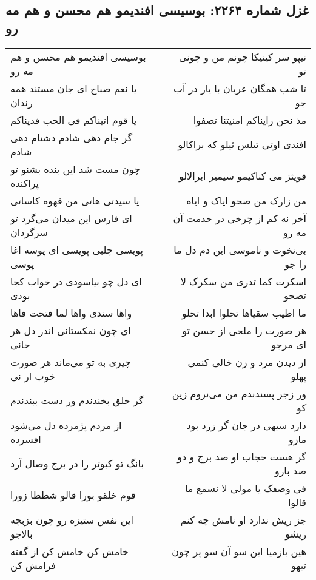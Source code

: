 \begin{center}
\section*{غزل شماره ۲۲۶۴: بوسیسی افندیمو هم محسن و هم مه رو}
\label{sec:2264}
\begin{longtable}{l p{0.5cm} r}
بوسیسی افندیمو هم محسن و هم مه رو
&&
نیپو سر کینیکا چونم من و چونی تو
\\
یا نعم صباح ای جان مستند همه رندان
&&
تا شب همگان عریان با یار در آب جو
\\
یا قوم اتیناکم فی الحب فدیناکم
&&
مذ نحن رایناکم امنیتنا تصفوا
\\
گر جام دهی شادم دشنام دهی شادم
&&
افندی اوتی تیلس ثیلو که براکالو
\\
چون مست شد این بنده بشنو تو پراکنده
&&
قویثز می کناکیمو سیمیر ابرالالو
\\
یا سیدتی هاتی من قهوه کاساتی
&&
من زارک من صحو ایاک و ایاه
\\
ای فارس این میدان می‌گرد تو سرگردان
&&
آخر نه کم از چرخی در خدمت آن مه رو
\\
پویسی چلبی پویسی ای پوسه اغا پوسی
&&
بی‌نخوت و ناموسی این دم دل ما را جو
\\
ای دل چو بیاسودی در خواب کجا بودی
&&
اسکرت کما تدری من سکرک لا تصحو
\\
واها سندی واها لما فتحت فاها
&&
ما اطیب سقیاها تحلوا ابدا تحلو
\\
ای چون نمکستانی اندر دل هر جانی
&&
هر صورت را ملحی از حسن تو ای مرجو
\\
چیزی به تو می‌ماند هر صورت خوب ار نی
&&
از دیدن مرد و زن خالی کنمی پهلو
\\
گر خلق بخندندم ور دست ببندندم
&&
ور زجر پسندندم من می‌نروم زین کو
\\
از مردم پژمرده دل می‌شود افسرده
&&
دارد سیهی در جان گر زرد بود مازو
\\
بانگ تو کبوتر را در برج وصال آرد
&&
گر هست حجاب او صد برج و دو صد بارو
\\
قوم خلقو بورا قالو شططا زورا
&&
فی وصفک یا مولی لا نسمع ما قالوا
\\
این نفس ستیزه رو چون بزبچه بالاجو
&&
جز ریش ندارد او نامش چه کنم ریشو
\\
خامش کن خامش کن از گفته فرامش کن
&&
هین بازمیا این سو آن سو پر چون تیهو
\\
\end{longtable}
\end{center}
